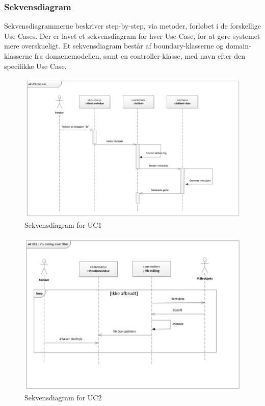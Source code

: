 \subsubsection{Sekvensdiagram}
Sekvensdiagrammerne beskriver step-by-step, via metoder, forløbet i de forskellige Use Cases. Der er lavet et sekvensdiagram for hver Use Case, for at gøre systemet mere overskueligt. Et sekvensdiagram består af boundary-klasserne og domain-klasserne fra domænemodellen, samt en controller-klasse, med navn efter den specifikke Use Case.

\begin{figure}[H]
	\centering
	\includegraphics[width=1\textwidth]{Figurer/Snip20151102_9}
	\caption{Sekvensdiagram for UC1}
\end{figure}

\begin{figure}[H]
	\centering
	\includegraphics[width=1\textwidth]{Figurer/Snip20151102_10}
	\caption{Sekvensdiagram for UC2}
\end{figure}

